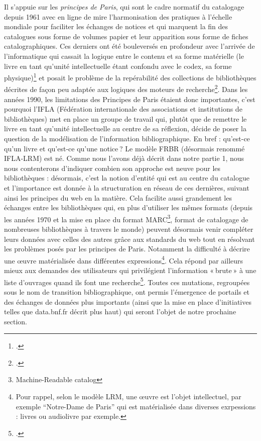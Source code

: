 Il s’appuie sur les \textit{principes de Paris}, qui sont le cadre normatif du catalogage depuis 1961 avec en ligne de mire l’harmonisation des pratiques à l’échelle mondiale pour faciliter les échanges de notices et qui marquent la fin des catalogues sous forme de volumes papier et leur apparition sous forme de fiches catalographiques. Ces derniers ont été bouleversés en profondeur avec l’arrivée de l’informatique qui cassait la logique entre le contenu et sa forme matérielle (le livre en tant qu’unité intellectuelle étant confondu avec le codex, sa forme physique)\footcite[§ 2]{leresche_transition_2016} et posait le problème de la repérabilité des collections de bibliothèques décrites de façon peu adaptée aux logiques des moteurs de recherche\footcite[§ 2]{leresche_transition_2016}. Dans les années 1990, les limitations des Principes de Paris étaient donc importantes, c’est pourquoi l’IFLA (Fédération internationale des associations et institutions de bibliothèques) met en place un groupe de travail qui, plutôt que de remettre le livre en tant qu’unité intellectuelle au centre de sa réflexion, décide de poser la question de la modélisation de l’information bibliographique. En bref : qu’est-ce qu’un livre et qu’est-ce qu’une notice ? Le modèle FRBR (désormais renommé IFLA-LRM) est né. Comme nous l’avons déjà décrit dans notre partie 1, nous nous contenterons d’indiquer combien son approche est neuve pour les bibliothèques : désormais, c’est la notion d’entité qui est au centre du catalogue et l’importance est donnée à la structuration en réseau de ces dernières, suivant ainsi les principes du web en la matière. Cela facilite aussi grandement les échanges entre les bibliothèques qui, en plus d’utiliser les mêmes formats (depuis les années 1970 et la mise en place du format MARC\footnote{Machine-Readable catalog}, format de catalogage de nombreuses bibliothèques à travers le monde) peuvent désormais venir compléter leurs données avec celles des autres grâce aux standards du web tout en résolvant les problèmes posés par les principes de Paris. Notamment la difficulté à décrire une œuvre matérialisée dans différentes expressions\footnote{Pour rappel, selon le modèle LRM, une œuvre est l'objet intellectuel, par exemple \enquote{Notre-Dame de Paris} qui est matérialisée dans diverses exrpessions : livres ou audiolivre par exemple.}. Cela répond par ailleurs mieux aux demandes des utilisateurs qui privilégient l’information « brute » à une liste d’ouvrages quand ils font une recherche\footcite[§ 13]{leresche_transition_2016}. Toutes ces mutations, regroupées sous le nom de transition bibliographique, ont permis l’émergence de portails et des échanges de données plus importants (ainsi que la mise en place d’initiatives telles que data.bnf.fr décrit plus haut) qui seront l’objet de notre prochaine section.

